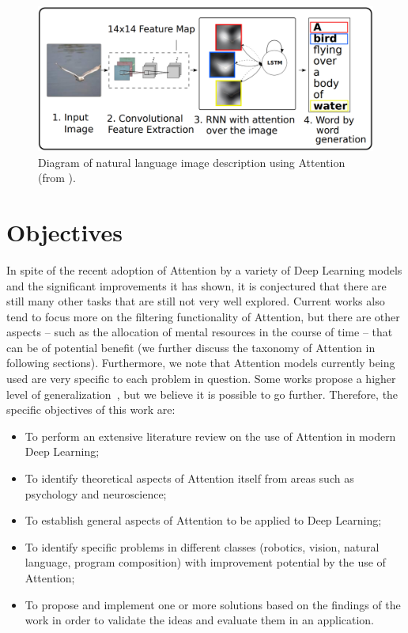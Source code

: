 \documentclass[English]{style/ic-tese-v3}
\begin{document}
\begin{figure}
\begin{center}
	\includegraphics[width=0.9\linewidth]{./img/img_captioning.png}
\caption{
    Diagram of natural language image description using Attention
    (from \cite{ref:img-captioning}).
}
\label{fig:description}
\end{center}
\end{figure}

\section{Objectives}
In spite of the recent adoption of Attention by a variety of Deep Learning models
and the significant improvements it has shown, it is conjectured that there are still many other tasks
that are still not very well explored.
Current works also tend to focus more on the filtering functionality of Attention,
but there are other aspects
-- such as the allocation of mental resources in the course of time -- that can be of potential benefit
(we further discuss the taxonomy of Attention in following sections).
Furthermore, we note that Attention models currently being used
are very specific to each problem in question.
Some works propose a higher level of generalization~\cite{ref:recurr-models},
but we believe it is possible to go further.
Therefore, the specific objectives of this work are:
\begin{itemize}
    \item To perform an extensive literature review on the use of Attention
        in modern Deep Learning;
    \item To identify theoretical aspects of Attention itself from areas such as psychology and neuroscience;
    \item To establish general aspects of Attention to be applied to Deep Learning;
    \item To identify specific problems in different classes
        (robotics, vision, natural language, program composition) with
        improvement potential by the use of Attention;
    \item To propose and implement one or more solutions based on the findings of the work in order to
        validate the ideas and evaluate them in an application.
\end{itemize}
\end{document}
